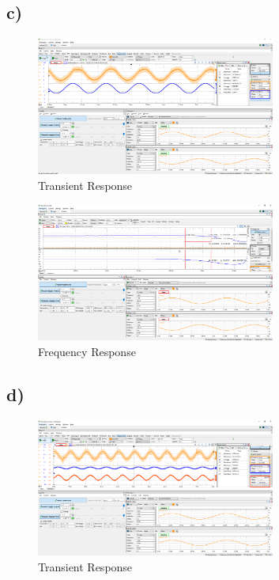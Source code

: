 \documentclass{article}
\begin{document}
	\subsection*{c)}

	\begin{figure}[H]
	    \centering
	    \includegraphics[width=0.7\textwidth]{w1c-1}
	    \caption{Transient Response}
	\end{figure}
	
	\begin{figure}[H]
	    \centering
	    \includegraphics[width=0.7\textwidth]{w1c-2-3}
	    \caption{Frequency Response}
	\end{figure}

	\subsection*{d)}
	
	\begin{figure}[H]
	    \centering
	    \includegraphics[width=0.7\textwidth]{w1d-1}
	    \caption{Transient Response}
	\end{figure}
	
\end{document}
